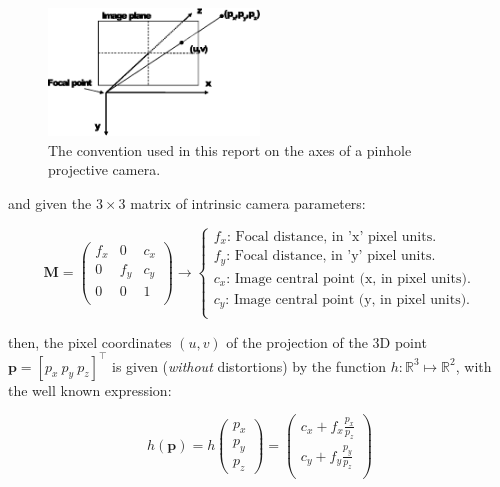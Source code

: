 \documentclass[a4paper,11pt]{report}
\begin{document}
\begin{figure}[h!]
\centering
\includegraphics[width=0.50\textwidth]{imgs/pinhole_model.eps}
\caption{The convention used in this report on the axes of a pinhole projective camera.}
\label{fig:pinhole}
\end{figure}

\noindent and given the $3 \times 3$ matrix of intrinsic camera parameters:

\begin{equation}
\mathbf{M}=
\left( 
\begin{array}{ccc}
 f_x & 0 & c_x \\
  0  & f_y & c_y \\
 0 & 0 & 1 \\
\end{array}
\right)
\longrightarrow
\left\{
\begin{array}{l}
 f_x\text{: Focal distance, in 'x' pixel units.} \\
 f_y\text{: Focal distance, in 'y' pixel units.} \\
 c_x\text{: Image central point (x, in pixel units).} \\
 c_y\text{: Image central point (y, in pixel units).} \\
\end{array}
\right.
\end{equation}


\noindent then, the pixel coordinates $(u,v)$ of the projection of the 
3D point $\mathbf{p}=[p_x ~ p_y ~ p_z]^\top$
is given (\emph{without} distortions) by the function $h: \mathbb{R}^3 \mapsto \mathbb{R}^2$, 
with the well known expression:

\begin{equation}
h(\mathbf{p}) = 
h\left(
\begin{array}{c}
 p_x \\ p_y \\p_z
\end{array}
\right) = 
\left(
\begin{array}{c}
 c_x + f_x  \frac{p_x}{p_z} \\
 c_y + f_y  \frac{p_y}{p_z} \\
\end{array}
\right)
\end{equation}
\end{document}
